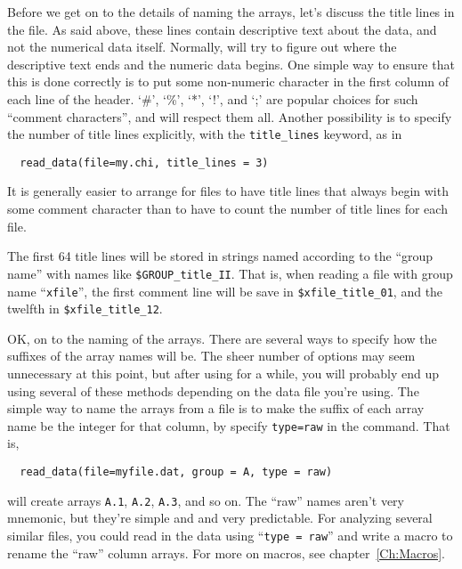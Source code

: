 Before we get on to the details of naming the arrays, let's discuss the
title lines in the file.  As said above, these lines contain descriptive
text about the data, and not the numerical data itself.  Normally,
{\ifeffit} will try to figure out where the descriptive text ends and the
numeric data begins.  One simple way to ensure that this is done correctly
is to put some non-numeric character in the first column of each line of
the header.  `\#', `\%', `*', `!', and `;' are popular choices for such
``comment characters'', and {\ifeffit} will respect them all.  Another
possibility is to specify the number of title lines explicitly, with the 
{\tt{title\_lines}} keyword, as in 
\begin{verbatim}
  read_data(file=my.chi, title_lines = 3)
\end{verbatim}
\noindent
It is generally easier to arrange for files to have title lines that always
begin with some comment character than to have to count the number of title
lines for each file. 
{}
{} 
{}

The first 64 title lines will be stored in strings named according to the
``group name'' with names like {\tt{\$GROUP\_title\_II}}.  That is, when
reading a file with group name ``{\tt{xfile}}'', the first comment line
will be save in {\tt{\$xfile\_title\_01}}, and the twelfth in
{\tt{\$xfile\_title\_12}}.

OK, on to the naming of the arrays.  There are several ways to specify how
the suffixes of the array names will be.  The sheer number of options may
seem unnecessary at this point, but after using {\ifeffit} for a while, you
will probably end up using several of these methods depending on the data
file you're using.  The simple way to name the arrays from a file is to
make the suffix of each array name be the integer for that column, by
specify {\texttt{type=raw}} in the {} command. That is,
\begin{verbatim}
  read_data(file=myfile.dat, group = A, type = raw)
\end{verbatim}
\noindent
will create arrays {\texttt{A.1}}, {\texttt{A.2}}, {\texttt{A.3}}, and so
on.  The ``raw'' names aren't very mnemonic, but they're simple and and
very predictable.  For analyzing several similar files, you could read in
the data using ``{\tt{type = raw}}'' and write a macro to rename the
``raw'' column arrays.  For more on macros, see chapter~{\ref{Ch:Macros}}.


